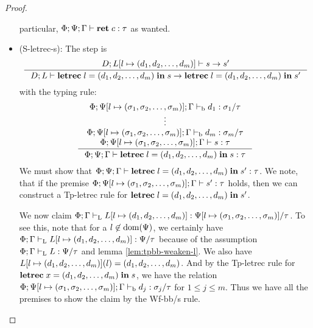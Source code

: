 \documentclass[a4paper, oneside, 10pt, final]{memoir}
\begin{document}
\begin{proof}
\begin{itemize}
    particular, $\Phi;\Psi;\Gamma |- \mathbf{ret} \; c : \tau$ as wanted.
  \item (S-letrec-s):
    The step is
      \begin{equation*}
        \inference{D;L[l \mapsto \dbundle] |- s -> s'}
        {D;L |- \iletrec{l}{\dbundle}{s} -> \iletrec{l}{\dbundle}{s'}}
      \end{equation*}
    with the typing rule:
        \begin{equation}
          \label{eq:preserv-tp-letrec-s}
          \inference{\Phi;\Psi[l \mapsto \bbtypes];\Gamma \tpb d_1 :
            \sigma_1 / \tau\\
            \vdots\\
            \Phi;\Psi[l \mapsto \bbtypes];\Gamma \tpb d_m : \sigma_m
            / \tau\\
            \Phi;\Psi[l \mapsto \bbtypes];\Gamma |- s : \tau}
          {\Phi;\Psi;\Gamma |- \iletrec{l}{\dbundle}{s} : \tau}\\\\
    \end{equation}
    We must show that $\Phi;\Psi;\Gamma |- \mathbf{letrec} \; l = (d_1, d_2, \dotsc, d_m) \; \mathbf{in} \; s' :
    \tau$. We note, that if the premise $\Phi;\Psi[l \mapsto
    (\sigma_1, \sigma_2, \dotsc, \sigma_m)];\Gamma |- s' : \tau$ holds, then we can construct a
    Tp-letrec rule for $\mathbf{letrec} \; l = (d_1, d_2, \dotsc, d_m) \; \mathbf{in} \; s'$.

    We now claim $\Phi;\Gamma |-_{\mathrm{L}} L[l\mapsto (d_1, d_2, \dotsc, d_m)] : \Psi[l \mapsto (\sigma_1, \sigma_2, \dotsc, \sigma_m)] / \tau$. To see this, note that for a $l \not
    \in \mathrm{dom}(\Psi)$, we certainly have
    $\Phi;\Gamma |-_{\mathrm{L}} L[l\mapsto (d_1, d_2, \dotsc, d_m)] : \Psi / \tau$ because of
    the assumption $\Phi;\Gamma |-_{\mathrm{L}} L : \Psi / \tau$ and lemma
    \ref{lem:tpbb-weaken-l}. We also have $L[l\mapsto (d_1, d_2, \dotsc, d_m)](l) =
    (d_1, d_2, \dotsc, d_m)$. And by the Tp-letrec rule for
    $\mathbf{letrec} \; x = (d_1, d_2, \dotsc, d_m) \; \mathbf{in} \; s$, we have the relation $\Phi;\Psi[l
    \mapsto (\sigma_1, \sigma_2, \dotsc, \sigma_m)];\Gamma |-_{\mathrm{b}} d_j : \sigma_j / \tau$ for $1 \leq j
    \leq m$. Thus we have all the premises to show the claim by the
    Wf-bb/s rule.


\end{itemize}
\end{proof}
\end{document}
